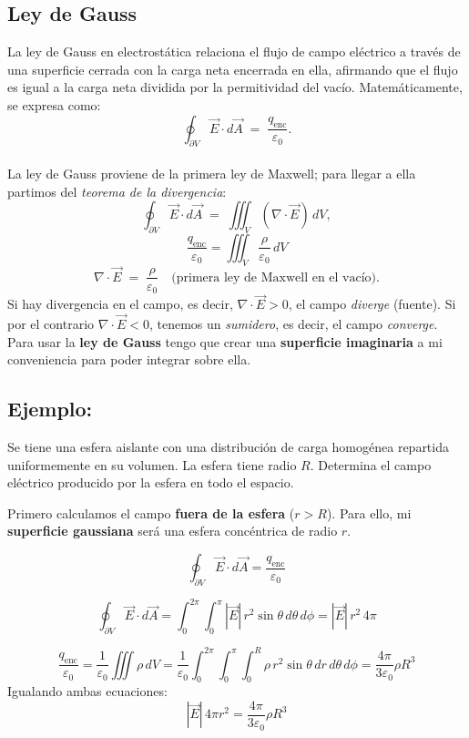 \documentclass[a4paper,12pt]{article}
\begin{document}
\bigskip
\subsection{Ley de Gauss}
\noindent
La ley de Gauss en electrostática relaciona el flujo de campo eléctrico a través de una
superficie cerrada con la carga neta encerrada en ella, afirmando que el flujo es igual
a la carga neta dividida por la permitividad del vacío. Matemáticamente, se expresa como:
\[
\oint_{\partial V}\vec E\cdot d\vec A \;=\; \frac{q_{\text{enc}}}{\varepsilon_0}.
\]\\
La ley de Gauss proviene de la primera ley de Maxwell; para llegar a ella partimos del
\emph{teorema de la divergencia}:
\[
\oint_{\partial V}\vec E\cdot d\vec A
\;=\;
\iiint_{V} (\nabla\!\cdot\!\vec E)\,dV,
\]
\[
\frac{q_{\text{enc}}}{\varepsilon_0}
=
\iiint_{V} \frac{\rho}{\varepsilon_0}\,dV
\]
\[
\nabla\!\cdot\!\vec E \;=\; \frac{\rho}{\varepsilon_0}
\quad\text{(primera ley de Maxwell en el vacío).}
\]
Si hay divergencia en el campo, es decir, \(\nabla\!\cdot\!\vec E>0\), el campo \emph{diverge} (fuente).
Si por el contrario \(\nabla\!\cdot\!\vec E<0\), tenemos un \emph{sumidero}, es decir, el campo \emph{converge}.\\

\noindent
Para usar la \textbf{ley de Gauss} tengo que crear una \textbf{superficie imaginaria} a mi conveniencia para poder integrar sobre ella.
\subsection*{Ejemplo:}
\noindent 
Se tiene una esfera aislante con una distribución de carga homogénea repartida uniformemente en su volumen.  
La esfera tiene radio \(R\). Determina el campo eléctrico producido por la esfera en todo el espacio.

\medskip
\noindent
Primero calculamos el campo \textbf{fuera de la esfera} (\(r > R\)).  
Para ello, mi \textbf{superficie gaussiana} será una esfera concéntrica de radio \(r\).

\[
\oint_{\partial V}\vec E\cdot d\vec A = \frac{q_{\text{enc}}}{\varepsilon_0}
\]

\[
\oint_{\partial V}\vec E\cdot d\vec A = \int_0^{2\pi}\int_0^{\pi} |\vec E|\, r^{2}\sin\theta\, d\theta\, d\phi = |\vec E|\,r^{2}\,4\pi
\]

\[
\frac{q_{\text{enc}}}{\varepsilon_0} = \frac{1}{\varepsilon_0}\iiint \rho\, dV = \frac{1}{\varepsilon_0}\int_0^{2\pi}\int_0^{\pi}\int_0^{R} \rho\, r^{2}\sin\theta\, dr\, d\theta\, d\phi = \frac{4\pi}{3\varepsilon_0}\rho R^{3}
\]
Igualando ambas ecuaciones:
\[
|\vec E|\,4\pi r^{2} = \frac{4\pi}{3\varepsilon_0}\rho R^{3}
\]
\end{document}
